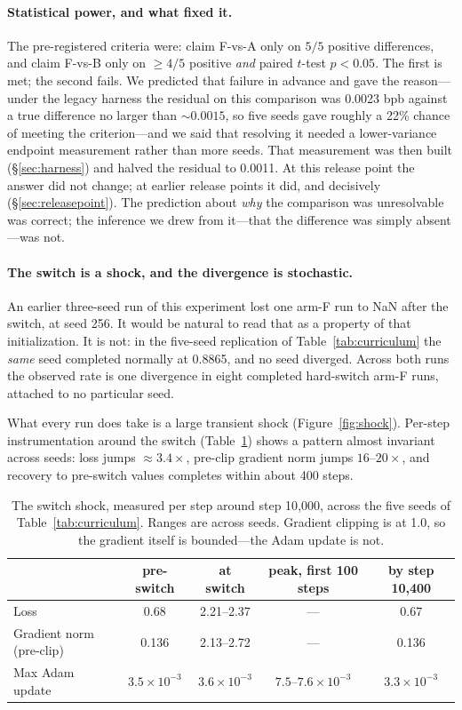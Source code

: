 \documentclass[11pt,a4paper]{article}
\begin{document}
\paragraph{Statistical power, and what fixed it.} The pre-registered criteria were: claim F-vs-A only on $5/5$ positive differences, and claim F-vs-B only on $\geq 4/5$ positive \emph{and} paired $t$-test $p < 0.05$. The first is met; the second fails. We predicted that failure in advance and gave the reason---under the legacy harness the residual on this comparison was 0.0023 bpb against a true difference no larger than ${\sim}0.0015$, so five seeds gave roughly a 22\% chance of meeting the criterion---and we said that resolving it needed a lower-variance endpoint measurement rather than more seeds. That measurement was then built (\S\ref{sec:harness}) and halved the residual to 0.0011. At this release point the answer did not change; at earlier release points it did, and decisively (\S\ref{sec:releasepoint}). The prediction about \emph{why} the comparison was unresolvable was correct; the inference we drew from it---that the difference was simply absent---was not.

\paragraph{The switch is a shock, and the divergence is stochastic.} An earlier three-seed run of this experiment lost one arm-F run to NaN after the switch, at seed 256. It would be natural to read that as a property of that initialization. It is not: in the five-seed replication of Table~\ref{tab:curriculum} the \emph{same} seed completed normally at 0.8865, and no seed diverged. Across both runs the observed rate is one divergence in eight completed hard-switch arm-F runs, attached to no particular seed.

What every run does take is a large transient shock (Figure~\ref{fig:shock}). Per-step instrumentation around the switch (Table~\ref{tab:shock}) shows a pattern almost invariant across seeds: loss jumps ${\approx}3.4\times$, pre-clip gradient norm jumps $16$--$20\times$, and recovery to pre-switch values completes within about 400 steps.

\begin{table}[H]
\centering
\caption{The switch shock, measured per step around step 10{,}000, across the five seeds of Table~\ref{tab:curriculum}. Ranges are across seeds. Gradient clipping is at 1.0, so the gradient itself is bounded---the Adam update is not.}
\label{tab:shock}
\begin{tabular}{lcccc}
\toprule
 & pre-switch & at switch & peak, first 100 steps & by step 10{,}400 \\
\midrule
Loss & 0.68 & 2.21--2.37 & --- & 0.67 \\
Gradient norm (pre-clip) & 0.136 & 2.13--2.72 & --- & 0.136 \\
Max Adam update & $3.5\times10^{-3}$ & $3.6\times10^{-3}$ & $7.5$--$7.6\times10^{-3}$ & $3.3\times10^{-3}$ \\
\bottomrule
\end{tabular}
\end{table}
\end{document}
